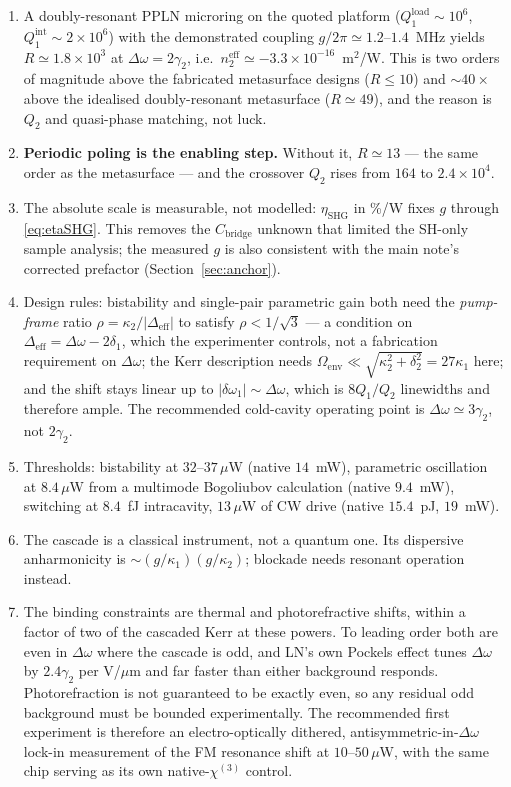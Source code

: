 \documentclass[11pt,a4paper]{article}
\newcommand{\chithree}{\chi^{(3)}}
\newcommand{\Dom}{\Delta\omega}
\newcommand{\etanorm}{\eta_{\text{SHG}}}
\begin{document}
\begin{enumerate}[leftmargin=1.8em,itemsep=3pt]
\item A doubly-resonant PPLN microring on the quoted platform
  ($Q_1^{\text{load}}\sim10^6$, $Q_1^{\text{int}}\sim2\times10^6$) with
  the demonstrated coupling $g/2\pi\simeq1.2$--$1.4$~MHz yields
  $R\simeq1.8\times10^3$ at $\Dom=2\gamma_2$, i.e.\
  $n_2^{\text{eff}}\simeq-3.3\times10^{-16}$~m$^2$/W.  This is two
  orders of magnitude above the fabricated metasurface designs
  ($R\le10$) and $\sim40\times$ above the idealised doubly-resonant
  metasurface ($R\simeq49$), and the reason is $Q_2$ and quasi-phase
  matching, not luck.
\item \textbf{Periodic poling is the enabling step.}  Without it,
  $R\simeq13$ --- the same order as the metasurface --- and the
  crossover $Q_2$ rises from $164$ to $2.4\times10^4$.
\item The absolute scale is measurable, not modelled: $\etanorm$ in
  \%/W fixes $g$ through \eqref{eq:etaSHG}.  This removes the
  $C_{\text{bridge}}$ unknown that limited the SH-only sample analysis;
  the measured $g$ is also consistent with the main note's corrected
  prefactor (Section~\ref{sec:anchor}).
\item Design rules: bistability and single-pair parametric gain both
  need the \emph{pump-frame} ratio $\rho=\kappa_2/|\Delta_{\text{eff}}|$
  to satisfy $\rho<1/\sqrt3$ --- a condition on $\Delta_{\text{eff}}=\Dom-2\delta_1$,
  which the experimenter controls, not a fabrication requirement on
  $\Dom$; the Kerr description needs
  $\Omega_{\text{env}}\ll\sqrt{\kappa_2^2+\delta_2^2}=27\kappa_1$ here;
  and the shift stays linear up to $|\delta\omega_1|\sim\Dom$, which is
  $8Q_1/Q_2$ linewidths and therefore ample.  The recommended cold-cavity
  operating point is $\Dom\simeq3\gamma_2$, not $2\gamma_2$.
\item Thresholds: bistability at $32$--$37\,\mu$W (native $14$~mW),
  parametric oscillation at $8.4\,\mu$W from a multimode Bogoliubov
  calculation (native $9.4$~mW), switching at $8.4$~fJ intracavity,
  $13\,\mu$W of CW drive (native $15.4$~pJ, $19$~mW).
\item The cascade is a classical instrument, not a quantum one.  Its
  dispersive anharmonicity is $\sim(g/\kappa_1)(g/\kappa_2)$; blockade
  needs resonant operation instead.
\item The binding constraints are thermal and photorefractive shifts,
  within a factor of two of the cascaded Kerr at these powers.  To
  leading order both are even in $\Dom$ where the cascade is odd, and
  LN's own Pockels effect tunes $\Dom$ by $2.4\gamma_2$ per V/$\mu$m and
  far faster than either background responds.  Photorefraction is not
  guaranteed to be exactly even, so any residual odd background must be
  bounded experimentally.  The recommended first experiment is therefore an
  electro-optically dithered, antisymmetric-in-$\Dom$ lock-in
  measurement of the FM resonance shift at $10$--$50\,\mu$W, with the
  same chip serving as its own native-$\chithree$ control.
\end{enumerate}
\end{document}
